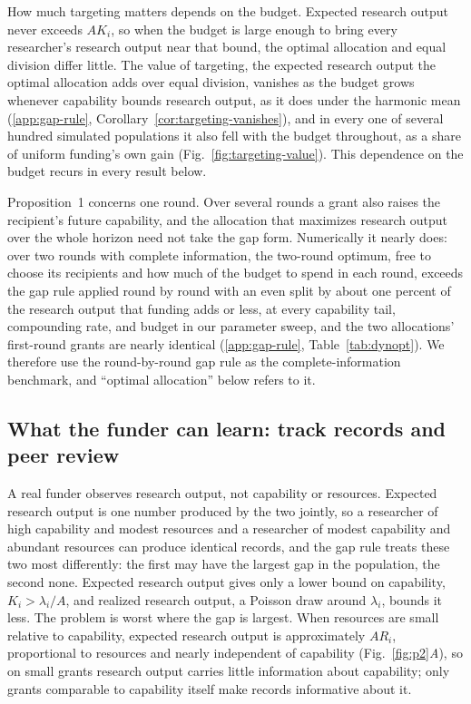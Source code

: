 \documentclass[article, 11pt, reqno]{amsart}
\theoremstyle{named}
\begin{document}
How much targeting matters depends on the budget. Expected research output never exceeds $AK_i$, so when the budget is large enough to bring every researcher's research output near that bound, the optimal allocation and equal division differ little. The value of targeting, the expected research output the optimal allocation adds over equal division, vanishes as the budget grows whenever capability bounds research output, as it does under the harmonic mean (\ref{app:gap-rule}, Corollary~\ref{cor:targeting-vanishes}), and in every one of several hundred simulated populations it also fell with the budget throughout, as a share of uniform funding's own gain (Fig.~\ref{fig:targeting-value}). This dependence on the budget recurs in every result below.

Proposition~1 concerns one round. Over several rounds a grant also raises the recipient's future capability, and the allocation that maximizes research output over the whole horizon need not take the gap form. Numerically it nearly does: over two rounds with complete information, the two-round optimum, free to choose its recipients and how much of the budget to spend in each round, exceeds the gap rule applied round by round with an even split by about one percent of the research output that funding adds or less, at every capability tail, compounding rate, and budget in our parameter sweep, and the two allocations' first-round grants are nearly identical (\ref{app:gap-rule}, Table~\ref{tab:dynopt}). We therefore use the round-by-round gap rule as the complete-information benchmark, and ``optimal allocation'' below refers to it.



\subsection*{What the funder can learn: track records and peer review}
A real funder observes research output, not capability or resources. Expected research output is one number produced by the two jointly, so a researcher of high capability and modest resources and a researcher of modest capability and abundant resources can produce identical records, and the gap rule treats these two most differently: the first may have the largest gap in the population, the second none. Expected research output gives only a lower bound on capability, $K_i > \lambda_i/A$, and realized research output, a Poisson draw around $\lambda_i$, bounds it less. The problem is worst where the gap is largest. When resources are small relative to capability, expected research output is approximately $AR_i$, proportional to resources and nearly independent of capability (Fig.~\ref{fig:p2}\textit{A}), so on small grants research output carries little information about capability; only grants comparable to capability itself make records informative about it.
\end{document}
